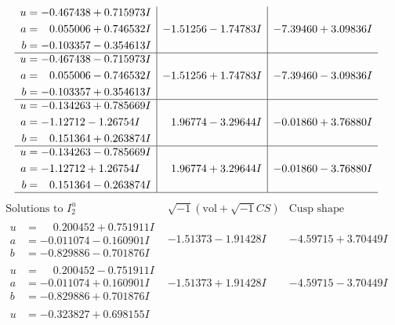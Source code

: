 \documentclass[1p]{elsarticle_modified}
\theoremstyle{definition}
\newcommand{\I}{\sqrt{-1}}
\begin{document}
$$\begin{array}{c|c|c}
\begin{aligned}
u &= -0.467438 + 0.715973 I \\
a &= \phantom{-}0.055006 + 0.746532 I \\
b &= -0.103357 - 0.354613 I\end{aligned}
 & -1.51256 - 1.74783 I & -7.39460 + 3.09836 I \\ \hline\begin{aligned}
u &= -0.467438 - 0.715973 I \\
a &= \phantom{-}0.055006 - 0.746532 I \\
b &= -0.103357 + 0.354613 I\end{aligned}
 & -1.51256 + 1.74783 I & -7.39460 - 3.09836 I \\ \hline\begin{aligned}
u &= -0.134263 + 0.785669 I \\
a &= -1.12712 - 1.26754 I \\
b &= \phantom{-}0.151364 + 0.263874 I\end{aligned}
 & \phantom{-}1.96774 - 3.29644 I & -0.01860 + 3.76880 I \\ \hline\begin{aligned}
u &= -0.134263 - 0.785669 I \\
a &= -1.12712 + 1.26754 I \\
b &= \phantom{-}0.151364 - 0.263874 I\end{aligned}
 & \phantom{-}1.96774 + 3.29644 I & -0.01860 - 3.76880 I\\
 \hline 
 \end{array}$$\newpage$$\begin{array}{c|c|c}  
\text{Solutions to }I^u_{2}& \I (\text{vol} + \sqrt{-1}CS) & \text{Cusp shape}\\
 \hline 
\begin{aligned}
u &= \phantom{-}0.200452 + 0.751911 I \\
a &= -0.011074 - 0.160901 I \\
b &= -0.829886 - 0.701876 I\end{aligned}
 & -1.51373 - 1.91428 I & -4.59715 + 3.70449 I \\ \hline\begin{aligned}
u &= \phantom{-}0.200452 - 0.751911 I \\
a &= -0.011074 + 0.160901 I \\
b &= -0.829886 + 0.701876 I\end{aligned}
 & -1.51373 + 1.91428 I & -4.59715 - 3.70449 I \\ \hline\begin{aligned}
u &= -0.323827 + 0.698155 I \\

\end{aligned}
\end{array}$$
\end{document}
